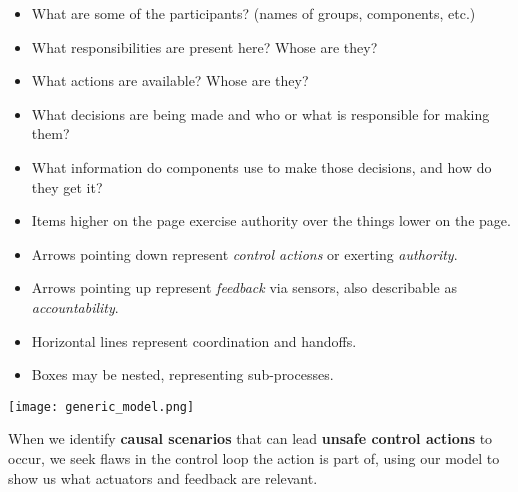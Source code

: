 \documentclass[letterpaper]{tufte-book}
\begin{document}

\begin{itemize}
\setlength{\itemsep}{0pt}
\setlength{\parskip}{.25em}
\item What are some of the participants? (names of groups, components, etc.)
\item What responsibilities are present here? Whose are they?
\item What actions are available? Whose are they?
\item What decisions are being made and who or what is responsible for making them?
\item What information do components use to make those decisions, and how do they get it?
\end{itemize}


\begin{itemize}
\setlength{\itemsep}{0pt}
\setlength{\parskip}{.25em}
\item Items higher on the page exercise authority over the things lower on the page.
\item Arrows pointing down represent \emph{control actions} or exerting \emph{authority}.
\item Arrows pointing up represent \emph{feedback} via sensors, also describable as \emph{accountability}.
\item Horizontal lines represent coordination and handoffs.
\item Boxes may be nested, representing sub-processes.
\end{itemize}

\begin{center}
\texttt{[image: generic\_model.png]}
\end{center}



When we identify \textbf{causal scenarios} that can lead \textbf{unsafe control actions} to occur, we seek flaws in the control loop the action is part of, using our model to show us what actuators and feedback are relevant.

\pagebreak



\end{document}
